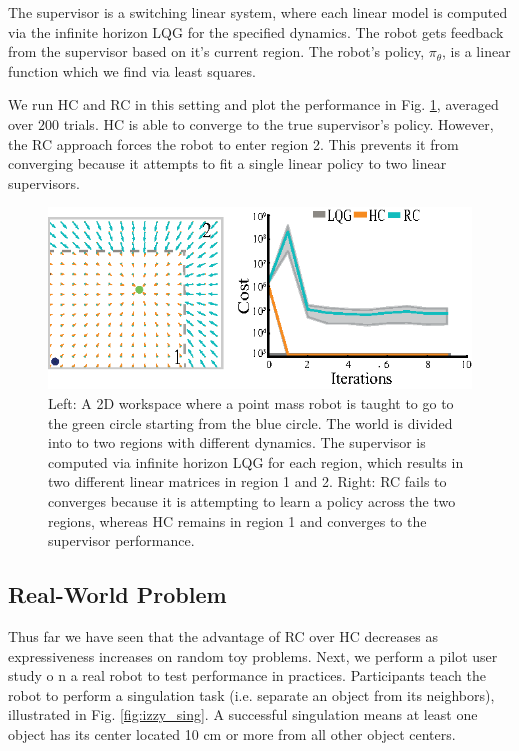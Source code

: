 \documentclass[10pt, conference]{ieeeconf}      %
\begin{document}
The supervisor is a switching linear system, where each linear model is computed via the infinite horizon LQG for the specified dynamics. The robot gets feedback from the supervisor based on it's current region. The robot's policy, $\pi_{\theta}$, is a linear function which we find via least squares. 

We run HC and RC in this setting and plot the performance in Fig. \ref{fig:p_mass}, averaged over $200$ trials.  HC is able to converge to the true supervisor's policy.
However, the RC approach forces the robot to enter region 2.
This prevents it from converging because it attempts to fit a single linear policy to two linear supervisors.

\begin{figure}
\centering
\includegraphics{f_figs/p_mass.eps}
\caption{
    \footnotesize
Left: A 2D workspace where a point mass robot is taught to go to the green circle starting from the blue circle. The world is divided into to two regions with different dynamics. The supervisor is computed via infinite horizon LQG for each region, which results in two different linear matrices in region 1 and 2. Right: RC fails to converges because it is attempting to learn a policy across the two regions, whereas HC remains in region 1 and converges to the supervisor performance. }
\vspace*{-1pt}
\label{fig:p_mass}
\end{figure}

\subsection{Real-World Problem}
Thus far we have seen that the advantage of RC over HC decreases as expressiveness increases on random toy problems. Next, we perform a pilot user study o n a real robot to test performance in practices.
Participants teach the robot to perform a singulation task (i.e. separate an object from its neighbors), illustrated in Fig. \ref{fig:izzy_sing}. A successful singulation means at least one object has its center located 10 cm or more from all other object centers. 
\end{document}
